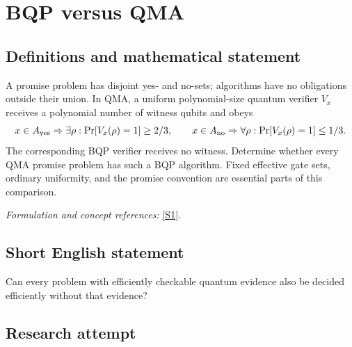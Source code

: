 \documentclass[11pt,a4paper]{article}
\newcommand{\sref}[2]{\hyperlink{source:#1:#2}{[S#2]}}
\newif\ifshowcatalogue
\newcommand{\cataloguescope}[1]{\ifshowcatalogue
 \paragraph{Exact scope in the supplied catalogue.}
 \begin{quote}\small #1\end{quote}\fi}
\numberwithin{equation}{section}
\begin{document}
\setcounter{section}{0}
\clearpage
\section*{\texorpdfstring{BQP versus QMA}{BQP versus QMA}}\label{30006695}
\subsection{Definitions and mathematical statement}
A promise problem has disjoint yes- and no-sets; algorithms have no obligations outside their union. In QMA, a uniform polynomial-size quantum verifier $V_x$ receives a polynomial number of witness qubits and obeys
\[
 x\in A_{\rm yes}\Rightarrow\exists\rho:\Pr[V_x(\rho)=1]\ge2/3,\qquad
 x\in A_{\rm no}\Rightarrow\forall\rho:\Pr[V_x(\rho)=1]\le1/3.
\]
The corresponding BQP verifier receives no witness. Determine whether every QMA promise problem has such a BQP algorithm. Fixed effective gate sets, ordinary uniformity, and the promise convention are essential parts of this comparison.
\par\smallskip\textit{Formulation and concept references:} \sref{30006695}{1}.
\cataloguescope{For promise problems A=(A\_yes,A\_no) with disjoint sets of finite binary strings, use polynomial-time uniform quantum circuits over a fixed effectively specified finite universal gate set, with polynomially many gates and |0> ancillas and a measured output bit. BQP has such a circuit accepting each yes input with probability>=2/3 and each no input with probability<=1/3. QMA permits a polynomial-length quantum witness: each yes input has a witness accepted with probability>=2/3, and every witness on each no input is accepted with probability<=1/3. Outside the promise no condition is imposed. Is QMA contained in BQP, equivalently BQP=QMA?}
\subsection{Short English statement}
Can every problem with efficiently checkable quantum evidence also be decided efficiently without that evidence?
\subsection{Research attempt}
\end{document}
